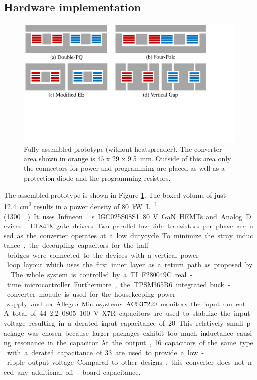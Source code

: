 \documentclass{IPEC2026}
\begin{document}
\subsection{Hardware implementation}
\begin{figure}
  \centering
  \includegraphics[page=2, trim = 0cm 0cm 3cm 0cm, clip, width=\columnwidth]{figures/IPEC_Figures_PowerPoint.pdf}
  \caption{Fully assembled prototype (without heatspreader).  The converter area shown in orange is 45 x 29 x \qty{9.5}{\mm}. Outside of this area only the connectors for power and programming are placed as well as a protection diode and the programming resistors.}
  \label{fig:PrototypePicture}
\end{figure}
The assembled prototype is shown in Figure \ref{fig:PrototypePicture}. The boxed volume of just \qty{12.4}{\cubic\cm} results in a power density of \qty{80}{\kW\per\liter} (\qty{1300}{\W\per\cubic\inch}) 
It uses Infineon's IGC025S08S1 \qty{80}{\V} GaN HEMTs and Analog Devices' LT8418 gate drivers. Two parallel low side transistors per phase are used as the converter operates at a low dutycycle. To minimize the stray inductance, the decoupling capacitors for the half-bridges were connected to the devices with a vertical power-loop layout which uses the first inner layer as a return path as proposed by \cite{reuschUnderstandingEffectPCB2014}.
The whole system is controlled by a TI F280049C real-time microcontroller. Furthermore, the TPSM365R6 integrated buck-converter module is used for the housekeeping power-supply and an Allegro Microsystems ACS37220 monitors the input current.
A total of 44 \qty{2.2}{\uF} 0805 \qty{100}{\V} X7R capacitors are used to stabilize the input voltage resulting in a derated input capacitance of \qty{20}{\uF}. This relatively small package was chosen because larger packages exhibit too much inductance causing resonance in the capacitor. At the output, 16 capacitors of the same type with a derated capacitance of \qty{33}{\uF} are used to provide a low-ripple output voltage. Compared to other designs, this converter does not need any additional off-board capacitance.
\end{document}
